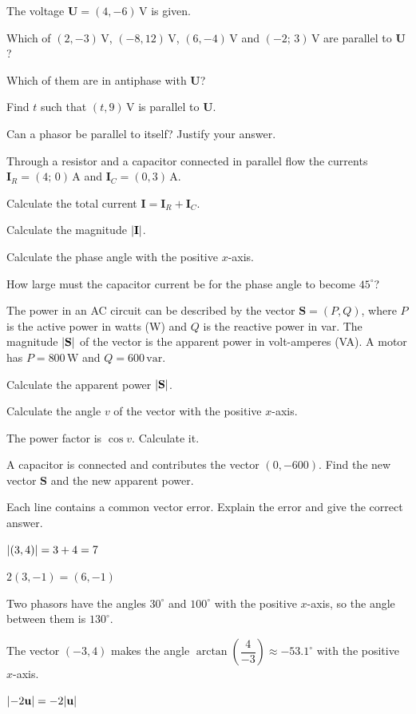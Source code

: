 The voltage $\mathbf{U} = (4, -6)\,\text{V}$ is given.
\begin{parts}
  \item Which of $(2, -3)\,\text{V}$, $(-8, 12)\,\text{V}$, $(6, -4)\,\text{V}$ and $(-2;\,
    3)\,\text{V}$ are parallel to $\mathbf{U}$?
  \item Which of them are in antiphase with $\mathbf{U}$?
  \item Find $t$ such that $(t, 9)\,\text{V}$ is parallel to $\mathbf{U}$.
  \item Can a phasor be parallel to itself? Justify your answer.
\end{parts}

Through a resistor and a capacitor connected in parallel flow the currents $\mathbf{I}_R = (4;\,
0)\,\text{A}$ and $\mathbf{I}_C = (0, 3)\,\text{A}$.
\begin{parts}
  \item Calculate the total current $\mathbf{I} = \mathbf{I}_R + \mathbf{I}_C$.
  \item Calculate the magnitude $\lvert\mathbf{I}\rvert$.
  \item Calculate the phase angle with the positive $x$-axis.
  \item How large must the capacitor current be for the phase angle to become $45^{\circ}$?
\end{parts}

The power in an AC circuit can be described by the vector $\mathbf{S} = (P, Q)$, where $P$ is
the active power in watts (W) and $Q$ is the reactive power in var. The magnitude
$\lvert\mathbf{S}\rvert$ of the vector is the apparent power in volt-amperes (VA). A motor has $P =
800\,\text{W}$ and $Q = 600\,\text{var}$.
\begin{parts}
  \item Calculate the apparent power $\lvert\mathbf{S}\rvert$.
  \item Calculate the angle $v$ of the vector with the positive $x$-axis.
  \item The power factor is $\cos v$. Calculate it.
  \item A capacitor is connected and contributes the vector $(0, -600)$. Find the new vector
    $\mathbf{S}$ and the new apparent power.
\end{parts}

Each line contains a common vector error. Explain the error and give the correct answer.
\begin{parts}
  \item $\lvert(3, 4)\rvert = 3 + 4 = 7$
  \item $2(3, -1) = (6, -1)$
  \item Two phasors have the angles $30^{\circ}$ and $100^{\circ}$ with the positive $x$-axis, so the
    angle between them is $130^{\circ}$.
  \item The vector $(-3, 4)$ makes the angle $\arctan\left(\dfrac{4}{-3}\right) \approx
    -53.1^{\circ}$ with the positive $x$-axis.
  \item $\lvert-2\mathbf{u}\rvert = -2\lvert\mathbf{u}\rvert$
\end{parts}

